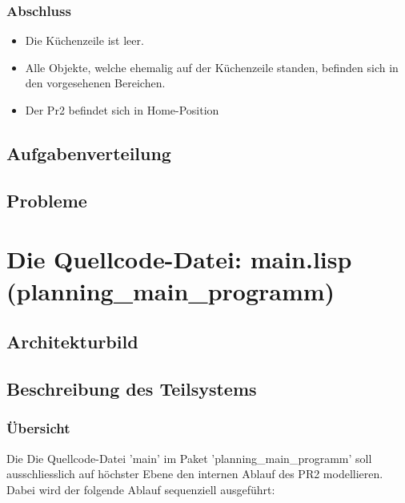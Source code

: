 \documentclass{suturo}
\begin{document}
\subsubsection{Abschluss}
\begin{itemize}
\item Die Küchenzeile ist leer.
\item Alle Objekte, welche ehemalig auf der Küchenzeile standen, befinden sich in den vorgesehenen Bereichen.
\item Der Pr2 befindet sich in Home-Position
\end{itemize}
\subsection{Aufgabenverteilung}
\subsection{Probleme}

\section{Die Quellcode-Datei: main.lisp (planning\_main\_programm)}
\subsection{Architekturbild}


\begin{figure}[!htb]
\end{figure}
      


\subsection{Beschreibung des Teilsystems}
\subsubsection{\"Ubersicht}\label{sec:main}
Die Die Quellcode-Datei 'main' im Paket 'planning\_main\_programm' soll ausschliesslich auf höchster Ebene den internen Ablauf des PR2 modellieren. Dabei wird der folgende Ablauf sequenziell ausgef\"uhrt:\\
\end{document}
